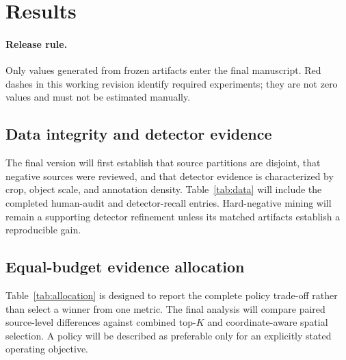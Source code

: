 \section{Results}
\paragraph{Release rule.}
Only values generated from frozen artifacts enter the final manuscript. Red dashes in this working revision identify required experiments; they are not zero values and must not be estimated manually.

\subsection{Data integrity and detector evidence}
The final version will first establish that source partitions are disjoint, that negative sources were reviewed, and that detector evidence is characterized by crop, object scale, and annotation density. Table~\ref{tab:data} will include the completed human-audit and detector-recall entries. Hard-negative mining will remain a supporting detector refinement unless its matched artifacts establish a reproducible gain.


\subsection{Equal-budget evidence allocation}
Table~\ref{tab:allocation} is designed to report the complete policy trade-off rather than select a winner from one metric. The final analysis will compare paired source-level differences against combined top-$K$ and coordinate-aware spatial selection. A policy will be described as preferable only for an explicitly stated operating objective.

